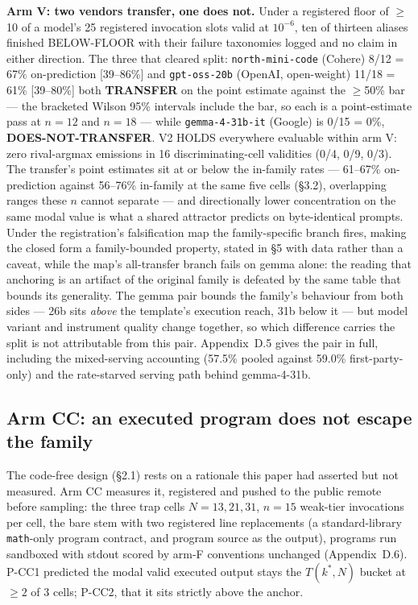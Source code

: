 \textbf{Arm V: two vendors transfer, one does not.} Under a registered floor of $\ge$10 of a
model's 25 registered invocation slots valid at $10^{-6}$, ten of thirteen aliases finished
BELOW-FLOOR with their failure taxonomies logged and no claim in either direction. The three that
cleared split: \texttt{north-mini-code} (Cohere) 8/12 = 67\% on-prediction [39--86\%] and
\texttt{gpt-oss-20b} (OpenAI, open-weight) 11/18 = 61\% [39--80\%] both \textbf{TRANSFER} on the
point estimate against the $\ge$50\% bar --- the bracketed Wilson 95\% intervals include the bar, so
each is a point-estimate pass at $n = 12$ and $n = 18$ --- while \texttt{gemma-4-31b-it} (Google) is
0/15 = 0\%, \textbf{DOES-NOT-TRANSFER}. V2 HOLDS everywhere evaluable within arm V: zero rival-argmax emissions
in 16 discriminating-cell validities (0/4, 0/9, 0/3). The transfer's point estimates sit at or below the in-family rates ---
61--67\% on-prediction against 56--76\% in-family at the same five cells (\S3.2), overlapping ranges
these $n$ cannot separate --- and directionally lower concentration on the same modal value is what a
shared attractor predicts on byte-identical prompts. Under the registration's falsification map the
family-specific branch fires, making the closed form a family-bounded property, stated in \S5 with
data rather than a caveat, while the map's all-transfer branch fails on gemma alone: the reading
that anchoring is an artifact of the original family is defeated by the same table that bounds its
generality. The gemma pair bounds the family's behaviour from both sides --- 26b sits \emph{above}
the template's execution reach, 31b below it --- but model variant and instrument quality change
together, so which difference carries the split is not attributable from this pair. Appendix~D.5
gives the pair in full, including the mixed-serving accounting (57.5\% pooled against 59.0\%
first-party-only) and the rate-starved serving path behind gemma-4-31b.

\subsection{Arm CC: an executed program does not escape the family}

The code-free design (\S2.1) rests on a rationale this paper had asserted but not measured. Arm CC
measures it, registered and pushed to the public remote before sampling: the three trap cells
$N = 13, 21, 31$, $n = 15$ weak-tier invocations per cell, the bare stem with two registered line
replacements (a standard-library \texttt{math}-only program contract, and program source as the
output), programs run sandboxed with stdout scored by arm-F conventions unchanged (Appendix~D.6).
P-CC1 predicted the modal valid executed output stays the $T(k^*, N)$ bucket at $\ge 2$ of 3 cells;
P-CC2, that it sits strictly above the anchor.

